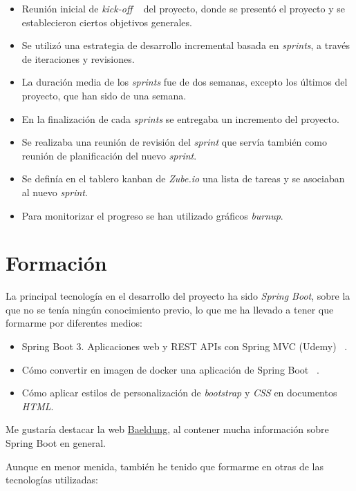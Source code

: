 \begin{itemize}
	\item Reunión inicial de \textit{kick-off} ~\cite{web:kickoff} del proyecto, donde se presentó el proyecto y se establecieron ciertos objetivos generales.
	\item Se utilizó una estrategia de desarrollo incremental basada en \textit{sprints}, a través de iteraciones y revisiones.
	\item La duración media de los \textit{sprints} fue de dos semanas, excepto los últimos del proyecto, que han sido de una semana.
	\item En la finalización de cada \textit{sprints} se entregaba un incremento del proyecto.
	\item Se realizaba una reunión de revisión del \textit{sprint} que servía también como reunión de planificación del nuevo \textit{sprint}.
	\item Se definía en el tablero kanban de \textit{Zube.io} una lista de tareas y se asociaban al nuevo \textit{sprint}.
	\item Para monitorizar el progreso se han utilizado gráficos \textit{burnup}.
\end{itemize}

\section{Formación}

La principal tecnología en el desarrollo del proyecto ha sido \textit{Spring Boot}, sobre la que no se tenía ningún conocimiento previo, lo que me ha llevado a tener que formarme por diferentes medios:

\begin{itemize}
	\item Spring Boot 3. Aplicaciones web y REST APIs con Spring MVC (Udemy) ~\cite{udemy:eliseo}.
	\item Cómo convertir en imagen de docker una aplicación de Spring Boot ~\cite{doc:springbootdocker}.
	\item Cómo aplicar estilos de personalización de \textit{bootstrap} y \textit{CSS} en documentos \textit{HTML}.
\end{itemize}

Me gustaría destacar la web \href{https://www.baeldung.com/spring-boot}{Baeldung}, al contener mucha información sobre Spring Boot en general.

Aunque en menor menida, también he tenido que formarme en otras de las tecnologías utilizadas:

